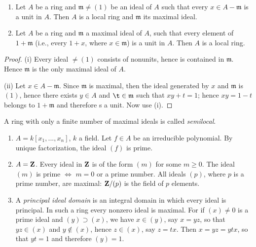 \begin{proposition}
\begin{enumerate}[noitemsep,label=(\roman*)]
\item Let $A$ be a ring and $\mathfrak{m}\neq (1)$ be an ideal of
  $A$ such that every $x\in A-\mathfrak{m}$ is a unit in
  $A$. Then $A$ is a local ring and $\mathfrak{m}$ its maximal
  ideal.
\item Let $A$ be a ring and $\mathfrak{m}$ a maximal ideal of
  $A$, such that every element of $1+\mathfrak{m}$ (i.e., every
  $1+x$, where $x\in\mathfrak{m}$) is a unit in $A$. Then $A$ is
  a local ring.
\end{enumerate}
\end{proposition}
\begin{proof}
(i) Every ideal $\neq(1)$ consists of nonunits, hence is
contained in $\mathfrak{m}$. Hence $\mathfrak{m}$ is the only
maximal ideal of $A$.

(ii) Let $x\in A-\mathfrak{m}$. Since $\mathfrak{m}$ is maximal,
then the ideal generated by $x$ and $\mathfrak{m}$ is $(1)$,
hence there exists $y\in A$ and $\t\in\mathfrak{m}$ such that
$xy+t=1$; hence $xy=1-t$ belongs to $1+\mathfrak{m}$ and
therefore s a unit. Now use (i).
\end{proof}
A ring with only a finite number of maximal ideals is called
\emph{semilocal}.
\begin{examples}
\begin{enumerate}[noitemsep,label=(\arabic*)]
\item $A=k[x_1,...,x_n]$, $k$ a field. Let $f\in A$ be an
  irreducible polynomial. By unique factorization, the ideal
  $(f)$ is prime.
\item $A=\mathbf{Z}$. Every ideal in $\mathbf{Z}$ is of the form $(m)$ for some
  $m\geq 0$. The ideal $(m)$ is prime $\iff$ $m=0$ or a prime
  number. All ideals $(p)$, where $p$ is a prime number, are
  maximal: $\mathbf{Z}/(p)$ is the field of $p$ elements.
\item A \emph{principal ideal domain} is an integral domain in
  which every ideal is principal. In such a ring every nonzero
  ideal is maximal. For if $(x)\neq 0$ is a prime ideal and
  $(y)\supset (x)$, we have $x\in (y)$, say $x=yz$, so that
  $yz\in (x)$ and $y\notin (x)$, hence $z\in (x)$, say
  $z=tx$. Then $x=yz=ytx$, so that $yt=1$ and therefore $(y)=1$.
\end{enumerate}
\end{examples}
